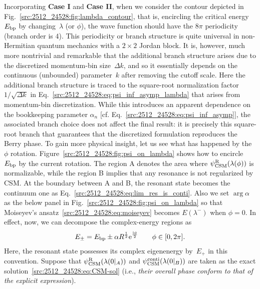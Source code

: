 Incorporating \textbf{Case I} and \textbf{Case II}, when we consider the contour depicted in Fig.~\ref{src:2512_24528:fig:lambda_contour}, that is, encircling the critical energy~$E_{\mathrm{bp}}$ by changing~$\lambda$ (or $\phi$), the wave function should have the $8\pi$ periodicity (branch order is $4$). This periodicity or branch structure is quite universal in non-Hermitian quantum mechanics with a $2\times 2$ Jordan block. It is, however, much more nontrivial and remarkable that the additional branch structure arises due to the discretized momentum-bin size~$\Delta k$, and so it essentially depends on the continuous (unbounded) parameter~$k$ after removing the cutoff scale.
Here the additional branch structure is traced to the square-root normalization factor~$1/\sqrt{\Delta k}$
in Eq.~\eqref{src:2512_24528:eq:psi_inf_asymp_lambda} that arises from momentum-bin discretization. While this introduces an apparent dependence on the bookkeeping parameter $\alpha_n$
[cf. Eq.~\eqref{src:2512_24528:eq:psi_inf_asymp}], the associated branch choice does not affect the final result: it is precisely this square-root branch that guarantees that the discretized formulation reproduces the Berry phase.
To gain more physical insight, let us see what has happened by the $\phi$ rotation.
Figure~\ref{src:2512_24528:fig:psi_on_lambda} shows how to encircle $E_{\mathrm{bp}}$ by the current rotation.
The region A denotes the area where $\psi^{\mathrm{R}}_{\mathrm{CSM}}(\lambda(\phi))$ is normalizable, while the region B implies that any resonance is not regularized by CSM.
At the boundary between A and B, the resonant state becomes the continuum one as Eq.~\eqref{src:2512_24528:eq:lim_res_is_conti}.
Also we set $\arg\alpha$ as the below panel in Fig.~\ref{src:2512_24528:fig:psi_on_lambda} so that Moiseyev's ansatz~\eqref{src:2512_24528:eq:moiseyev} becomes $E(\lambda^{-})$ when $\phi=0$.
In effect, now, we can decompose the complex-energy regions as
\begin{align}
    E_{\pm} = E_{\mathrm{bp}} \pm \alpha R^{\frac{1}{2}} \mathrm{e}^{\frac{\mathrm{i} \phi}{2}} 
    \qquad
    \phi\in[0,2\pi].
\end{align}
Here, the resonant state possesses its complex eigenenergy by~$E_+$ in this convention.
Suppose that $\psi^{\mathrm{R}}_{\mathrm{CSM}}(\lambda(0|_A))$ and $\psi^{\mathrm{conti}}_{\mathrm{CSM}}(\lambda(0|_B))$ are taken as the exact solution~\eqref{src:2512_24528:eq:CSM-sol} (i.e., \textit{their overall phase conform to that of the explicit expression}).
